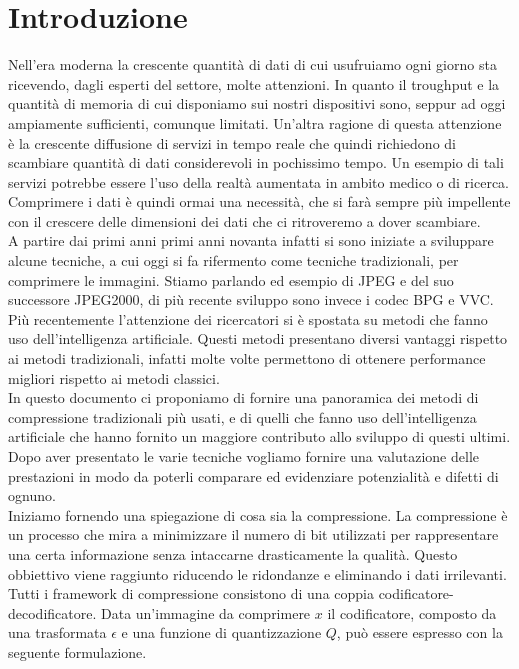 \chapter*{Introduzione}
Nell’era moderna la crescente quantità di dati di cui usufruiamo ogni giorno sta ricevendo, dagli esperti del settore, molte attenzioni. In quanto il troughput e la quantità di memoria di cui disponiamo sui nostri dispositivi sono, seppur ad oggi ampiamente sufficienti, comunque limitati. Un’altra ragione di questa attenzione è la crescente diffusione di servizi in tempo reale che quindi richiedono di scambiare quantità di dati considerevoli in pochissimo tempo. Un esempio di tali servizi potrebbe essere l’uso della realtà aumentata in ambito medico o di ricerca. Comprimere i dati è quindi ormai una necessità, che si farà sempre più impellente con il crescere delle dimensioni dei dati che ci ritroveremo a dover scambiare.\\
A partire dai primi anni primi anni novanta infatti si sono iniziate a sviluppare alcune tecniche, a cui oggi si fa rifermento come tecniche tradizionali, per comprimere le immagini. Stiamo parlando ed esempio di JPEG e del suo successore JPEG2000, di più recente sviluppo sono invece i codec BPG e VVC.
Più recentemente l’attenzione dei ricercatori si è spostata su metodi che fanno uso dell'intelligenza artificiale. Questi metodi presentano diversi vantaggi rispetto ai metodi tradizionali, infatti molte volte permettono di ottenere performance migliori rispetto ai metodi classici.\\
In questo documento ci proponiamo di fornire una panoramica dei metodi di compressione tradizionali più usati, e di quelli che fanno uso dell'intelligenza artificiale che hanno fornito un maggiore contributo allo sviluppo di questi ultimi. Dopo aver presentato le varie tecniche vogliamo fornire una valutazione delle prestazioni in modo da poterli comparare ed evidenziare potenzialità e difetti di ognuno.\\
Iniziamo fornendo una spiegazione di cosa sia la compressione. La compressione è un processo che mira a minimizzare il numero di bit utilizzati per rappresentare una certa informazione senza intaccarne drasticamente la qualità. Questo obbiettivo viene raggiunto riducendo le ridondanze e eliminando i dati irrilevanti.
Tutti i framework di compressione consistono di una coppia codificatore-decodificatore. Data un’immagine da comprimere $x$ il codificatore, composto da una trasformata $\epsilon$ e una funzione di quantizzazione $Q$, può essere espresso con la seguente formulazione.\\
